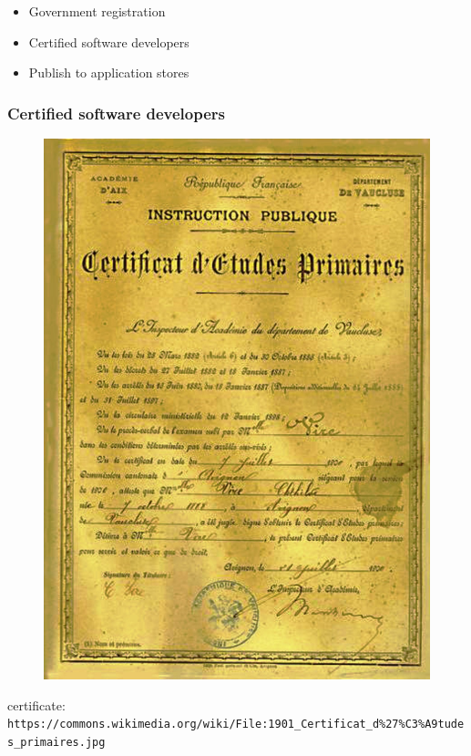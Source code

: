 \begin{itemize}
\item Government registration
\item Certified software developers
\item Publish to application stores
\end{itemize}

\begin{frame}[fragile]
\frametitle{Certified software developers}


\begin{figure}
\includegraphics[scale=0.2]{certificate}
\end{figure}

\end{frame}

certificate: \verb|https://commons.wikimedia.org/wiki/File:1901_Certificat_d%27%C3%A9tudes_primaires.jpg|

